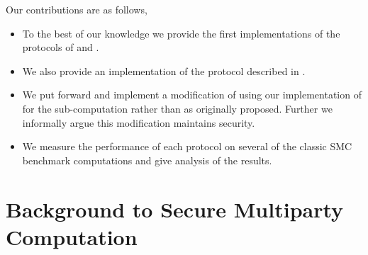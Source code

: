 \documentclass[ %
                    author={Nicholas Tutte},
                supervisor={Prof. Nigel Smart},
                    degree={MEng},
                     title={Secure Two Party Computation},
                  subtitle={A practical comparison of recent protocols},
                      type={Research - GG1K},
                      year={2015} ]{dissertation}
\begin{document}

		Our contributions are as follows,

		\begin{itemize}
			\item To the best of our knowledge we provide the first implementations of the protocols of \cite{LindellAndPinkas2011} and \cite{Lindell_CnC_2013}.
			\item We also provide an implementation of the protocol described in \cite{Katz_Symm_CnC_2013}.
			\item We put forward and implement a modification of \cite{Lindell_CnC_2013} using our implementation of \cite{Katz_Symm_CnC_2013} for the sub-computation rather than \cite{LindellAndPinkas2011} as originally proposed. Further we informally argue this modification maintains security.
			\item We measure the performance of each protocol on several of the classic SMC benchmark computations and give analysis of the results.
		\end{itemize}




	\chapter{Background to Secure Multiparty Computation} \label{sec:BG_toSMC}
\end{document}
